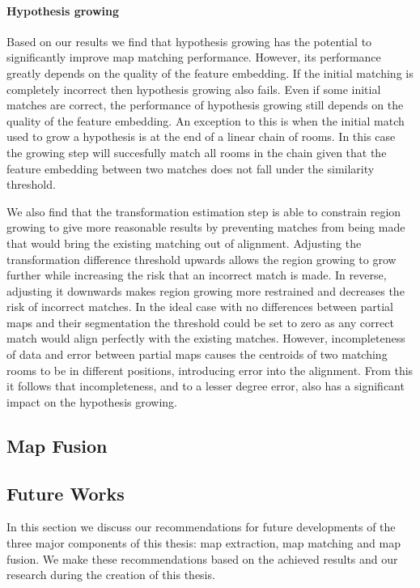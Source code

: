 \paragraph{Hypothesis growing}
Based on our results we find that hypothesis growing has the potential to significantly improve map matching performance. However, its performance greatly depends on the quality of the feature embedding. If the initial matching is completely incorrect then hypothesis growing also fails. Even if some initial matches are correct, the performance of hypothesis growing still depends on the quality of the feature embedding. An exception to this is when the initial match used to grow a hypothesis is at the end of a linear chain of rooms. In this case the growing step will succesfully match all rooms in the chain given that the feature embedding between two matches does not fall under the similarity threshold. 

We also find that the transformation estimation step is able to constrain region growing to give more reasonable results by preventing matches from being made that would bring the existing matching out of alignment. Adjusting the transformation difference threshold upwards allows the region growing to grow further while increasing the risk that an incorrect match is made. In reverse, adjusting it downwards makes region growing more restrained and decreases the risk of incorrect matches. In the ideal case with no differences between partial maps and their segmentation the threshold could be set to zero as any correct match would align perfectly with the existing matches. However, incompleteness of data and error between partial maps causes the centroids of two matching rooms to be in different positions, introducing error into the alignment. From this it follows that incompleteness, and to a lesser degree error, also has a significant impact on the hypothesis growing.


\subsection{Map Fusion}


\subsection{Future Works}
In this section we discuss our recommendations for future developments of the three major components of this thesis: map extraction, map matching and map fusion. We make these recommendations based on the achieved results and our research during the creation of this thesis. 

